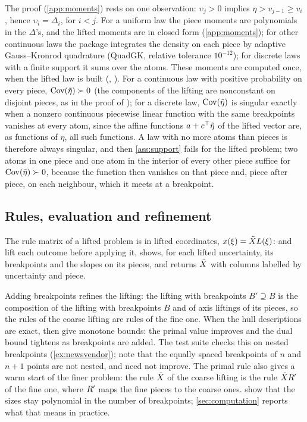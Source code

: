 The proof (\cref{app:moments}) rests on one observation: $\upsilon_j > 0$ implies $\eta > v_{j-1} \ge v_i$, hence $\upsilon_i = \Delta_i$, for $i < j$.
For a uniform law the piece moments are polynomials in the $\Delta$'s, and the lifted moments are in closed form (\cref{app:moments});
for other continuous laws the package integrates the density on each piece by adaptive Gauss--Kronrod quadrature (QuadGK, relative tolerance $10^{-12}$);
for discrete laws with a finite support it sums over the atoms.
These moments are computed once, when the lifted law is built (, ).
For a continuous law with positive probability on every piece, $\operatorname{Cov}(\tilde\eta) \succ 0$ (the components of the lifting are nonconstant on disjoint pieces, as in the proof of \citet[Proposition~4.1]{GWK2015});
for a discrete law, $\operatorname{Cov}(\tilde\eta)$ is singular exactly when a nonzero continuous piecewise linear function with the same breakpoints vanishes at every atom,
since the affine functions $a + c^\top \tilde\eta$ of the lifted vector are, as functions of $\eta$, all such functions.
A law with no more atoms than pieces is therefore always singular, and then \cref{ass:support} fails for the lifted problem;
two atoms in one piece and one atom in the interior of every other piece suffice for $\operatorname{Cov}(\tilde\eta) \succ 0$,
because the function then vanishes on that piece and, piece after piece, on each neighbour, which it meets at a breakpoint.

\subsection{Rules, evaluation and refinement}

The rule matrix of a lifted problem is in lifted coordinates, $x(\xi) = \tilde XL(\xi)$:
 and  lift each outcome before applying it,
 shows, for each lifted uncertainty, its breakpoints and the slopes on its pieces,
and  returns $\tilde X$ with columns labelled by uncertainty and piece.

Adding breakpoints refines the lifting:
the lifting with breakpoints $B' \supseteq B$ is the composition of the lifting with breakpoints $B$ and of axis liftings of its pieces,
so the rules of the coarse lifting are rules of the fine one.
When the hull descriptions are exact, \citet[Remark~3.5 and Theorem~3.8]{GWK2015} then give monotone bounds:
the primal value improves and the dual bound tightens as breakpoints are added.
The test suite checks this on nested breakpoints (\cref{ex:newsvendor});
note that the equally spaced breakpoints of $n$ and $n+1$ points are not nested, and need not improve.
The primal rule also gives a warm start of the finer problem: the rule $\tilde X$ of the coarse lifting is the rule $\tilde XR'$ of the fine one, where $R'$ maps the fine pieces to the coarse ones.
\citet[Theorem~4.4]{GWK2015} show that the sizes stay polynomial in the number of breakpoints;
\cref{sec:computation} reports what that means in practice.

